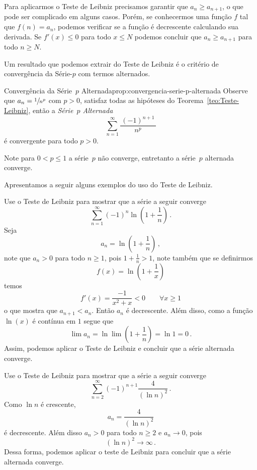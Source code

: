 Para aplicarmos o Teste de Leibniz precisamos garantir que $a_n\geq a_{n+1}$,
o que pode ser complicado em alguns casos. Porém, se conhecermos uma função $f$
tal que $f(n)=a_n$, podemos verificar se a função é decrescente calculando sua
derivada. Se $f'(x)\leq 0$ para todo $x\leq N$ podemos concluir que
$a_n\geq a_{n+1}$ para todo $n\geq N$.

Um resultado que podemos extrair do Teste de Leibniz é o critério de convergência
da Série-$p$ com termos alternados.

\begin{proposicao}{Convergência da Série~$p$ Alternada}{prop:convergencia-serie-p-alternada}
  Observe que $a_n=\sfrac{1}{n^p}$ com $p>0$, satisfaz todas as hipóteses do
  Teorema~\ref{teo:Teste-Leibniz},
  então a \emph{Série~$p$ Alternada}
  \[
    \sum_{n=1}^\infty \frac{\,(-1)^{n+1}\,}{n^p}
  \]
  é convergente para todo $p>0$.
\end{proposicao}

Note para $0<p\leq 1$ a série~$p$ não converge,
entretanto a série~$p$ alternada converge.

Apresentamos a seguir alguns exemplos do uso do Teste de Leibniz.

\begin{example}
  Use o Teste de Leibniz para mostrar que a série a seguir converge
  \[
    \sum_{n=1}^\infty(-1)^{n}\ln\left(1+\frac{1}{n}\right)     \,.
  \]
  \solution
  Seja
  \[
    a_n=\ln\left(1+\frac{1}{n}\right)    \,,
  \]
  note que $a_n>0$ para todo $n\geq 1$, pois
  \(
    1 + \frac{1}{n} > 1
  \),
  note também que se definirmos
  \[
    f(x) = \ln\left(1+\frac{1}{x}\right)
  \]
  temos
  \[
    f'(x)=\frac{-1}{x^2+x}<0 \qquad \forall x\geq 1
  \]
  o que mostra que $a_{n+1}<a_n$.
  Então $a_n$ é decrescente. Além disso, como a função $\ln(x)$ é contínua em $1$
  segue que
  \[
    \lim a_n = \ln\lim \left(1+\frac{1}{n}\right)
             = \ln 1
             = 0     \,.
  \]
  Assim, podemos aplicar o Teste de Leibniz e concluir que a série alternada converge.
\end{example}

\begin{example}
  Use o Teste de Leibniz para mostrar que a série a seguir converge
  \[
    \sum_{n=2}^\infty(-1)^{n+1}\frac{4}{(\ln n)^2}   \,.
  \]
  \solution
  Como  $\ln n$ é crescente,
  \[
    a_n = \frac{4}{(\ln n)^2}
  \]
  é decrescente.
  Além disso $a_n>0$ para todo $n\geq 2$ e $a_n\to 0$, pois
  \[
    \left(\ln n\right)^2\to \infty    \,.
  \]
  Dessa forma, podemos aplicar o teste de Leibniz para concluir que a série alternada converge.
\end{example}

